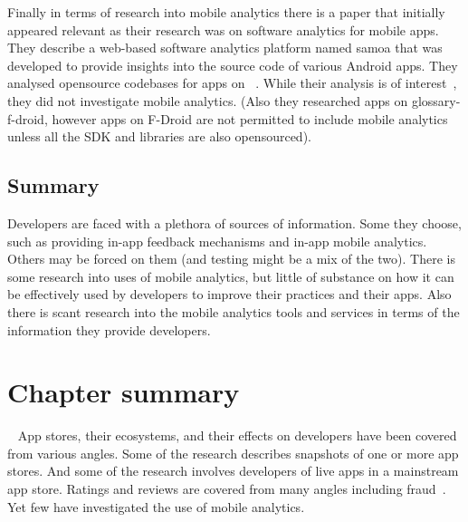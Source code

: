 Finally in terms of research into mobile analytics there is a paper that initially appeared relevant as their research was on software analytics for mobile apps. They describe a web-based software analytics platform named \Gls{samoa} that was developed to provide insights into the source code of various Android apps. They analysed opensource codebases for apps on ~. While their analysis is of interest~, they did not investigate mobile analytics. (Also they researched apps on \Gls{glossary-f-droid}, however apps on F-Droid are not permitted to include mobile analytics unless all the SDK and libraries are also opensourced).

\subsection{Summary} %
Developers are faced with a plethora of sources of information. Some they choose, such as providing in-app feedback mechanisms and in-app mobile analytics. Others may be forced on them (and testing might be a mix of the two). There is some research into uses of mobile analytics, but little of substance on how it can be effectively used by developers to improve their practices and their apps. Also there is scant research into the mobile analytics tools and services in terms of the information they provide developers.


\section{Chapter summary}~\label{rw-summary-section}
App stores, their ecosystems, and their effects on developers have been covered from various angles. Some of the research describes snapshots of one or more app stores. And some of the research involves developers of live apps in a mainstream app store. Ratings and reviews are covered from many angles including fraud~. Yet few have investigated the use of mobile analytics.


